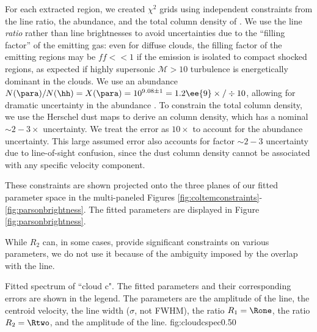 For each extracted region, we created $\chi^2$ grids using independent
constraints from the line ratio, the \formaldehyde abundance, and the total
column density of \hh.  We use the line \emph{ratio} rather than line
brightnesses to avoid uncertainties due to the ``filling factor'' of the
emitting gas: even for diffuse clouds, the filling factor of the emitting
regions may be $ff<<1$ if the emission is isolated to compact shocked regions,
as expected if highly supersonic $\mathcal{M}>10$ turbulence is energetically
dominant in the clouds.  We use an abundance $N(\para)/N(\hh) = X(\para) =
10^{9.08\pm1} = 1.2\ee{9} \times/\div 10$, allowing for dramatic uncertainty in
the \formaldehyde abundance
\citep{Ginsburg2013a,Carey1998a,Wootten1978a,Mundy1987a}.  To constrain the
total column density, we use the Herschel dust maps to derive an \hh column
density, which has a nominal $\sim2-3\times$ uncertainty.  We treat the error
as $10\times$ to account for the abundance uncertainty.  This large assumed
error also accounts for factor $\sim2-3$ uncertainty due to line-of-sight
confusion, since the dust column density cannot be associated with any specific
velocity component.

These constraints are shown projected onto the three planes of our fitted
parameter space in the multi-paneled Figures
\ref{fig:coltemconstraints}-\ref{fig:parsonbrightness}.  The fitted parameters
are displayed in Figure \ref{fig:parsonbrightness}.

While $R_2$ can, in some cases, provide significant constraints on various
parameters, we do not use it because of the ambiguity imposed by the overlap
with the \methanol \fourtwotwo line.



{Fitted spectrum of ``cloud c".  The fitted parameters and their corresponding
errors are shown in the legend.  The parameters are the amplitude of the
\formaldehyde \threeohthree line, the centroid velocity, the line width
($\sigma$, not FWHM), the ratio $R_1 = \Rone$,
the ratio $R_2 = \Rtwo$, and the amplitude of
the \methanol \fourtwotwo line.  }
{fig:cloudcspec}{0.5}{0}

